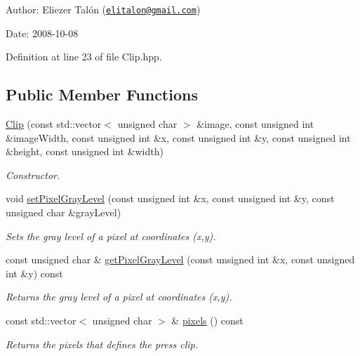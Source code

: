 \begin{Desc}
\item[Author:]Eliezer Talón (\href{mailto:elitalon@gmail.com}{\tt elitalon@gmail.com}) \end{Desc}
\begin{Desc}
\item[Date:]2008-10-08 \end{Desc}


Definition at line 23 of file Clip.hpp.\subsection*{Public Member Functions}
\begin{CompactItemize}
\item 
\hyperlink{class_clip_bcda5a8d32fda0933bce32d6d9f2c5a1}{Clip} (const std::vector$<$ unsigned char $>$ \&image, const unsigned int \&imageWidth, const unsigned int \&x, const unsigned int \&y, const unsigned int \&height, const unsigned int \&width)
\begin{CompactList}\small\item\em Constructor. \item\end{CompactList}\item 
void \hyperlink{class_clip_454ff6070d0918e56a09a3f28ff430c3}{setPixelGrayLevel} (const unsigned int \&x, const unsigned int \&y, const unsigned char \&grayLevel)
\begin{CompactList}\small\item\em Sets the gray level of a pixel at coordinates (x,y). \item\end{CompactList}\item 
const unsigned char \& \hyperlink{class_clip_85d16f086803860fae205c48161a3c38}{getPixelGrayLevel} (const unsigned int \&x, const unsigned int \&y) const 
\begin{CompactList}\small\item\em Returns the gray level of a pixel at coordinates (x,y). \item\end{CompactList}\item 
const std::vector$<$ unsigned char $>$ \& \hyperlink{class_clip_2d705268c905b41efd5caad63e4b3b4f}{pixels} () const 
\begin{CompactList}\small\item\em Returns the pixels that defines the press clip. \item\end{CompactList}\item 

\end{CompactItemize}
